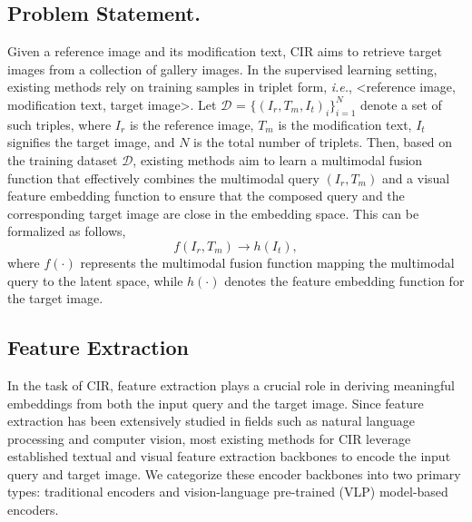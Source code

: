 \subsection{Problem Statement.} Given a reference image and its modification text, CIR aims to retrieve target images from a collection of gallery images. In the supervised learning setting, existing methods rely on training samples in triplet form, \textit{i.e.}, <reference image, modification text, target image>. Let $\mathcal{D}$ = $\{(I_r,T_m,I_t)_i\}^N_{i=1}$ denote a set of such triples, where $I_r$ is the reference image, $T_m$ is the modification text, $I_t$ signifies the target image, and $N$ is the total number of triplets. Then, based on the training dataset $\mathcal{D}$, existing methods aim to learn a multimodal fusion function that effectively combines the multimodal query $(I_r,T_m)$ and a visual feature embedding function to ensure that the composed query and the corresponding target image are close in the embedding space. This can be formalized as follows,
\begin{equation}
f(I_r,T_m) \rightarrow h(I_t), 
\end{equation}
where $f(\cdot)$ represents the multimodal fusion function mapping the multimodal query to the latent space, while $h(\cdot)$ denotes the feature embedding function for the target image. 


\subsection{Feature Extraction}
In the task of CIR, feature extraction plays a crucial role in deriving meaningful embeddings from both the input query and the target image. Since feature extraction has been extensively studied in fields such as natural language processing and computer vision, most existing methods for CIR leverage established textual and visual feature extraction backbones to encode the input query and target image. We categorize these encoder backbones into two primary types: traditional encoders and vision-language pre-trained (VLP) model-based encoders.


